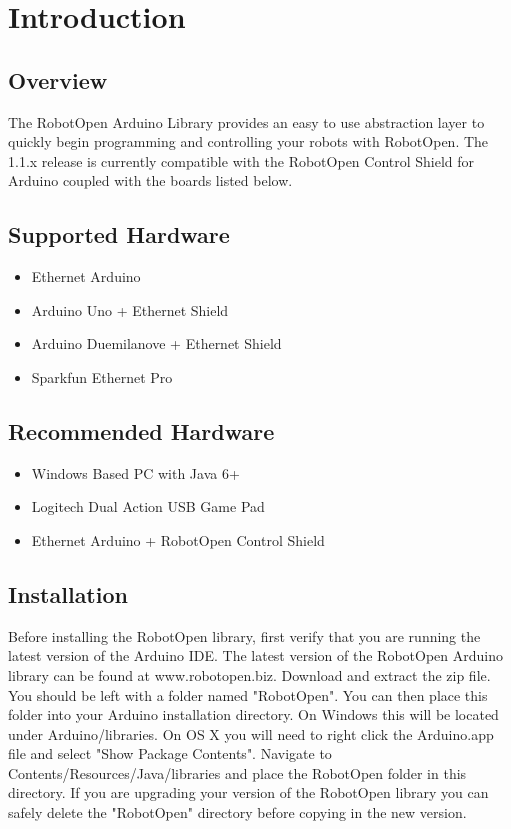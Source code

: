 \documentclass[11pt]{article} %
\begin{document}
\section*{}
\section{Introduction}

\subsection{Overview}
The RobotOpen Arduino Library provides an easy to use abstraction layer to quickly begin programming and controlling your robots with RobotOpen. The 1.1.x release is currently compatible with the RobotOpen Control Shield for Arduino coupled with the boards listed below. 

\subsection{Supported Hardware}

\begin{itemize}
\item Ethernet Arduino
\item Arduino Uno + Ethernet Shield
\item Arduino Duemilanove + Ethernet Shield
\item Sparkfun Ethernet Pro
\end{itemize}

\subsection{Recommended Hardware}
\begin{itemize}
\item Windows Based PC with Java 6+
\item Logitech Dual Action USB Game Pad
\item Ethernet Arduino + RobotOpen Control Shield
\end{itemize}

\subsection{Installation}
Before installing the RobotOpen library, first verify that you are running the latest version of the Arduino IDE. The latest version of the RobotOpen Arduino library can be found at www.robotopen.biz. Download and extract the zip file. You should be left with a folder named "RobotOpen". You can then place this folder into your Arduino installation directory. On Windows this will be located under Arduino/libraries. On OS X you will need to right click the Arduino.app file and select "Show Package Contents". Navigate to Contents/Resources/Java/libraries and place the RobotOpen folder in this directory. If you are upgrading your version of the RobotOpen library you can safely delete the "RobotOpen" directory before copying in the new version.
\end{document}
